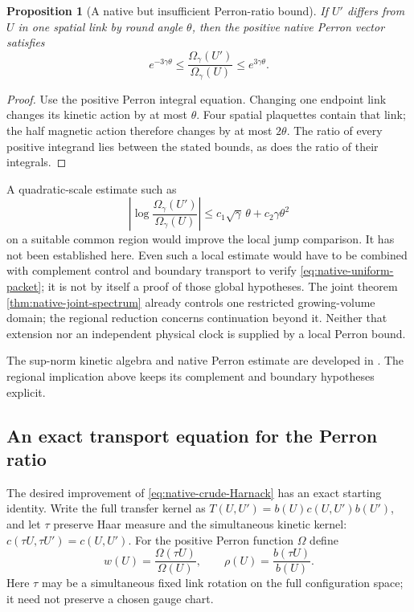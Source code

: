 \documentclass[11pt,oneside,openany]{book}
\newtheorem{proposition}[proposition]{Proposition}
\theoremstyle{definition}
\theoremstyle{remark}
\newcommand{\src}[2]{\cite[#2]{#1}}
\newcommand{\sourcebasis}[1]{\par\smallskip\noindent #1\par}
\begin{document}
\begin{proposition}[A native but insufficient Perron-ratio bound]
\label{prop:native-crude-Harnack}
If $U'$ differs from $U$ in one spatial link by round angle $\theta$,
then the positive native Perron vector satisfies
\begin{equation}
 e^{-3\gamma\theta}\le
     \frac{\Omega_\gamma(U')}{\Omega_\gamma(U)}
                              \le e^{3\gamma\theta}.
 \label{eq:native-crude-Harnack}
\end{equation}
\end{proposition}
\begin{proof}
Use the positive Perron integral equation. Changing one endpoint link
changes its kinetic action by at most $\theta$. Four spatial
plaquettes contain that link; the half magnetic action therefore
changes by at most $2\theta$. The ratio of every positive integrand
lies between the stated bounds, as does the ratio of their integrals.
\end{proof}
A quadratic-scale estimate such as
\[
 \left|\log\frac{\Omega_\gamma(U')}{\Omega_\gamma(U)}\right|
          \le c_1\sqrt\gamma\,\theta+c_2\gamma\theta^2
\]
on a suitable common region would improve the local jump comparison.
It has not been established here. Even such a local estimate would
have to be combined with complement control and boundary transport
to verify \cref{eq:native-uniform-packet}; it is not by itself a
proof of those global hypotheses. The joint theorem
\cref{thm:native-joint-spectrum} already controls one restricted
growing-volume domain; the regional reduction concerns continuation
beyond it. Neither that extension nor an independent physical clock
is supplied by a local Perron bound.
\sourcebasis{The sup-norm kinetic algebra and native Perron estimate
are developed in \src{F16}{V64}. The regional implication above keeps
its complement and boundary hypotheses explicit.}


\subsection{An exact transport equation for the Perron ratio}
\label{sec:native-Perron-transport}
The desired improvement of \cref{eq:native-crude-Harnack} has an
exact starting identity. Write the full transfer kernel as
$T(U,U')=b(U)c(U,U')b(U')$, and let $\tau$ preserve Haar measure
and the simultaneous kinetic kernel:
$c(\tau U,\tau U')=c(U,U')$. For the positive Perron function
$\Omega$ define
\[
 w(U)=\frac{\Omega(\tau U)}{\Omega(U)},\qquad
 \rho(U)=\frac{b(\tau U)}{b(U)}.
\]
Here $\tau$ may be a simultaneous fixed link rotation on the full
configuration space; it need not preserve a chosen gauge chart.
\end{document}
